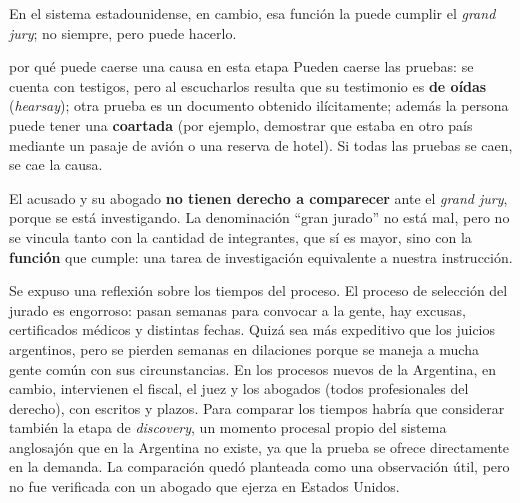 \documentclass[12pt,oneside]{book}
\begin{document}
En el sistema estadounidense, en cambio, esa función la puede cumplir el \textit{grand jury}; no siempre, pero puede hacerlo.

\begin{example}{por qué puede caerse una causa en esta etapa}
Pueden caerse las pruebas: se cuenta con testigos, pero al escucharlos resulta que su testimonio es \textbf{de oídas} (\textit{hearsay}); otra prueba es un documento obtenido ilícitamente; además la persona puede tener una \textbf{coartada} (por ejemplo, demostrar que estaba en otro país mediante un pasaje de avión o una reserva de hotel). Si todas las pruebas se caen, se cae la causa.
\end{example}

El acusado y su abogado \textbf{no tienen derecho a comparecer} ante el \textit{grand jury}, porque se está investigando. La denominación ``gran jurado'' no está mal, pero no se vincula tanto con la cantidad de integrantes, que sí es mayor, sino con la \textbf{función} que cumple: una tarea de investigación equivalente a nuestra instrucción.

\begin{note}
Se expuso una reflexión sobre los tiempos del proceso. El proceso de selección del jurado es engorroso: pasan semanas para convocar a la gente, hay excusas, certificados médicos y distintas fechas. Quizá sea más expeditivo que los juicios argentinos, pero se pierden semanas en dilaciones porque se maneja a mucha gente común con sus circunstancias. En los procesos nuevos de la Argentina, en cambio, intervienen el fiscal, el juez y los abogados (todos profesionales del derecho), con escritos y plazos. Para comparar los tiempos habría que considerar también la etapa de \textit{discovery}, un momento procesal propio del sistema anglosajón que en la Argentina no existe, ya que la prueba se ofrece directamente en la demanda. La comparación quedó planteada como una observación útil, pero no fue verificada con un abogado que ejerza en Estados Unidos.
\end{note}
\end{document}
